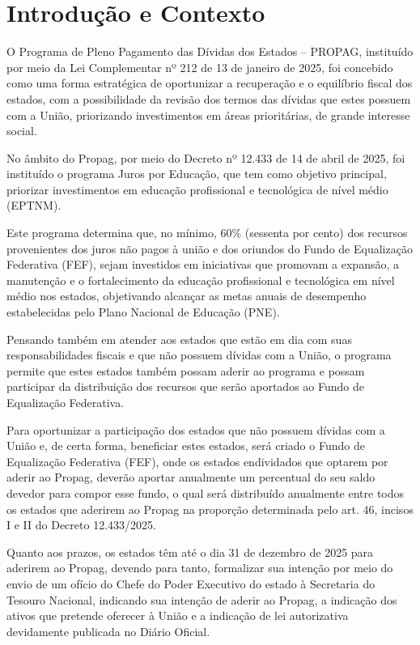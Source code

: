 \section{Introdução e Contexto}

O Programa de Pleno Pagamento das Dívidas dos Estados – PROPAG, instituído por meio da Lei Complementar nº 212 de 13 de janeiro de 2025, foi concebido como uma forma estratégica de oportunizar a recuperação e o equilíbrio fiscal dos estados, com a possibilidade da revisão dos termos das dívidas que estes possuem com a União, priorizando investimentos em áreas prioritárias, de grande interesse social.

No âmbito do Propag, por meio do Decreto nº 12.433 de 14 de abril de 2025, foi instituído o programa Juros por Educação, que tem como objetivo principal, priorizar investimentos em educação profissional e tecnológica de nível médio (EPTNM).

Este programa determina que, no mínimo, 60\% (sessenta por cento) dos recursos provenientes dos juros não pagos à união e dos oriundos do Fundo de Equalização Federativa (FEF), sejam investidos em iniciativas que promovam a expansão, a manutenção e o fortalecimento da educação profissional e tecnológica em nível médio nos estados, objetivando alcançar as metas anuais de desempenho estabelecidas pelo Plano Nacional de Educação (PNE).

Pensando também em atender aos estados que estão em dia com suas responsabilidades fiscais e que não possuem dívidas com a União, o programa permite que estes estados também possam aderir ao programa e possam participar da distribuição dos recursos que serão aportados ao Fundo de Equalização Federativa.

Para oportunizar a participação dos estados que não possuem dívidas com a União e, de certa forma, beneficiar estes estados, será criado o Fundo de Equalização Federativa (FEF), onde os estados endividados que optarem por aderir ao Propag, deverão aportar anualmente um percentual do seu saldo devedor para compor esse fundo, o qual será distribuído anualmente entre todos os estados que aderirem ao Propag na proporção determinada pelo art. 46, incisos I e II do Decreto 12.433/2025.

Quanto aos prazos, os estados têm até o dia 31 de dezembro de 2025 para aderirem ao Propag, devendo para tanto, formalizar sua intenção por meio do envio de um ofício do Chefe do Poder Executivo do estado à Secretaria do Tesouro Nacional, indicando sua intenção de aderir ao Propag, a indicação dos ativos que pretende oferecer à União e a indicação de lei autorizativa devidamente publicada no Diário Oficial.

